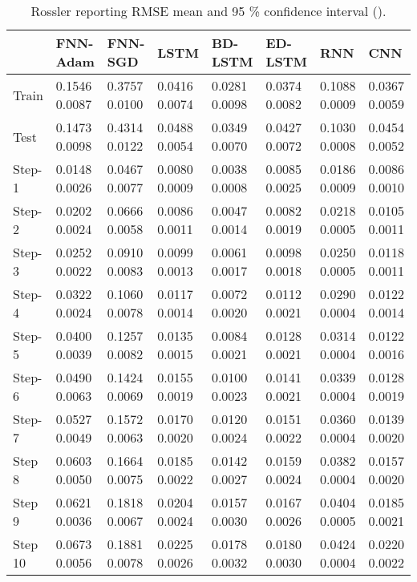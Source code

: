 \documentclass{ieeeaccess}
\begin{document}
\begin{table*}[htbp]
\smaller 
\caption{Rossler reporting RMSE mean and 95 \% confidence interval   ().}
\label{tab:rossler}
\begin{tabular}{llllllll}
\hline
 &  FNN-Adam& FNN-SGD & LSTM & BD-LSTM  & ED-LSTM & RNN& CNN \\
\hline
\hline
		
Train &      
0.1546	0.0087&
0.3757	0.0100&
0.0416	0.0074&
0.0281	0.0098&
0.0374	0.0082&
0.1088	0.0009&0.0367		0.0059\\
Test &      
0.1473	0.0098&
0.4314	0.0122&
0.0488	0.0054&
0.0349	0.0070&
0.0427	0.0072&
0.1030	0.0008&	0.0454		0.0052\\
Step-1 &      
0.0148	0.0026&
0.0467	0.0077&
0.0080	0.0009&
0.0038	0.0008&
0.0085	0.0025&
0.0186	0.0009&	0.0086		0.0010\\
Step-2 &      
0.0202	0.0024&
0.0666	0.0058&
0.0086	0.0011&
0.0047	0.0014&
0.0082	0.0019&
0.0218	0.0005&0.0105		0.0011\\
Step-3 &      
0.0252	0.0022&
0.0910	0.0083&
0.0099	0.0013&
0.0061	0.0017&
0.0098	0.0018&
0.0250	0.0005&	0.0118		0.0011\\
Step-4 &      
0.0322	0.0024&
0.1060	0.0078&
0.0117	0.0014&
0.0072	0.0020&
0.0112	0.0021&
0.0290	0.0004&	0.0122		0.0014\\
Step-5 &      
0.0400	0.0039&
0.1257	0.0082&
0.0135	0.0015&
0.0084	0.0021&
0.0128	0.0021&
0.0314	0.0004&0.0122		0.0016\\
Step-6 &      
0.0490	0.0063&
0.1424	0.0069&
0.0155	0.0019&
0.0100	0.0023&
0.0141	0.0021&
0.0339	0.0004&	0.0128		0.0019\\
Step-7 &      
0.0527	0.0049&
0.1572	0.0063&
0.0170	0.0020&
0.0120	0.0024&
0.0151	0.0022&
0.0360	0.0004&	0.0139		0.0020\\
Step 8 &      
0.0603	0.0050&
0.1664	0.0075&
0.0185	0.0022&
0.0142	0.0027&
0.0159	0.0024&
0.0382	0.0004&	0.0157		0.0020\\
Step 9 &      
0.0621	0.0036&
0.1818	0.0067&
0.0204	0.0024&
0.0157	0.0030&
0.0167	0.0026&
0.0404	0.0005&	0.0185		0.0021\\
Step 10 &      
0.0673	0.0056&
0.1881	0.0078&
0.0225	0.0026&
0.0178	0.0032&
0.0180	0.0030&
0.0424	0.0004&	0.0220		0.0022\\
\hline
 
\end{tabular}

\end{table*}
\end{document}
